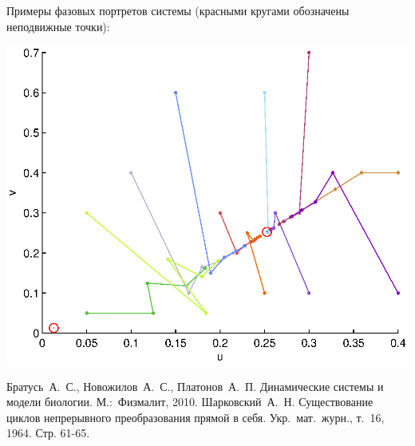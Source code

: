 \documentclass[11pt]{article}
\begin{document}
Примеры фазовых портретов системы (красными кругами обозначены неподвижные точки):

\includegraphics[scale=1.0]{pics/2dim_system.eps}

\pagebreak
{}
\begin{thebibliography}{99}
 Братусь~А.~С., Новожилов~А.~С., Платонов~А.~П. Динамические системы и модели биологии. М.:~Физмалит, 2010.
 Шарковский~А.~Н. Существование циклов непрерывного преобразования прямой в себя. Укр.~мат.~журн., т.~16, 1964. Стр. 61-65.
\end{thebibliography}
\end{document}
